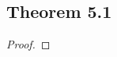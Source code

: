 \documentclass[../../main.tex]{subfiles}
\begin{document}
\subsection{Theorem 5.1}
\begin{wts}

\end{wts}
\begin{proof}

\end{proof}
\end{document}
